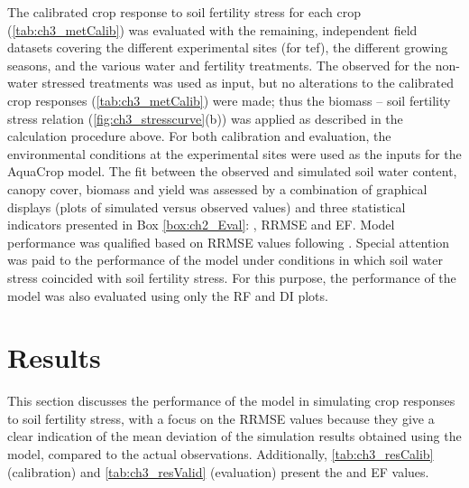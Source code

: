 The calibrated crop response to soil fertility stress for each crop (\autoref{tab:ch3_metCalib}) was evaluated with the remaining, independent field datasets covering the different experimental sites (for tef), the different growing seasons, and the various water and fertility treatments. The observed \Brel for the non-water stressed treatments was used as input, but no alterations to the calibrated crop responses (\autoref{tab:ch3_metCalib}) were made; thus the biomass – soil fertility stress relation (\autoref{fig:ch3_stresscurve}(b)) was applied as described in the calculation procedure above. For both calibration and evaluation, the environmental conditions at the experimental sites were used as the inputs for the AquaCrop model. 
The fit between the observed and simulated soil water content, canopy cover, biomass and yield was assessed by a combination of graphical displays (plots of simulated versus observed values) and three statistical indicators presented in Box \ref{box:ch2_Eval}: \Rsq, RRMSE and EF. Model performance was qualified based on RRMSE values following \textcite{jamieson1991}. Special attention was paid to the performance of the model under conditions in which soil water stress coincided with soil fertility stress. For this purpose, the performance of the model was also evaluated using only the RF and DI plots.  

\section{Results}
This section discusses the performance of the model in simulating crop responses to soil fertility stress, with a focus on the RRMSE values because they give a clear indication of the mean deviation of the simulation results obtained using the model, compared to the actual observations. Additionally, \autoref{tab:ch3_resCalib} (calibration) and \autoref{tab:ch3_resValid} (evaluation) present the \Rsq and EF values.

